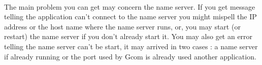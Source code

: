 \paragraph{}{
    The main problem you can get may concern the name server.
 If you get message telling the application can't connect to the
 name server you might mispell the IP address or the host name
 where the name server runs, or, you may start (or restart) the
 name server if you don't already start it. \newline
 You may also get an error telling the name server can't be start,
 it may arrived in two cases : a name server if already running
 or the port used by Gcom is already used another application.
}



